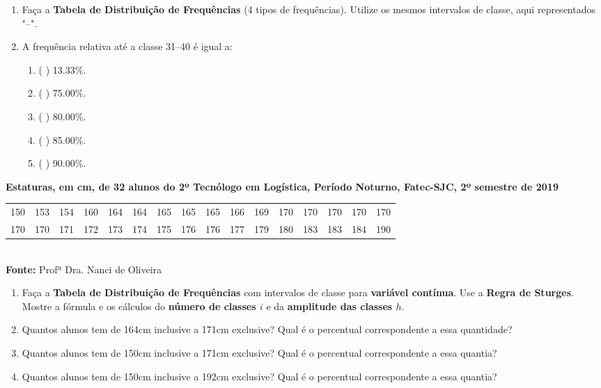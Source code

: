 \documentclass{jhwhw}
\begin{document}
\begin{enumerate}[label=\alph*)]
	\item Faça a \textbf{Tabela de Distribuição de Frequências} (4 tipos de frequências). Utilize os mesmos intervalos de classe, aqui representados "--".
	\item A frequência relativa até a classe 31--40 é igual a:
	      \begin{enumerate}[label=\textbf{\Alph*)}]
		      \item ( ) 13.33\%.
		      \item ( ) 75.00\%.
		      \item ( ) 80.00\%.
		      \item ( ) 85.00\%.
		      \item ( ) 90.00\%.
	      \end{enumerate}
\end{enumerate}

\begin{center}
	\textbf{Estaturas, em cm, de 32 alunos do 2º Tecnólogo em Logística, Período Noturno, Fatec-SJC, 2º semestre de 2019}\\
	\setlength{\tabcolsep}{4pt}
	\begin{tabular}{llllllllllllllll}
		\hline
		150 & 153 & 154 & 160 & 164 & 164 & 165 & 165 & 165 & 166 & 169 & 170 & 170 & 170 & 170 & 170 \\
		170 & 170 & 171 & 172 & 173 & 174 & 175 & 176 & 176 & 177 & 179 & 180 & 183 & 183 & 184 & 190 \\
		\hline
	\end{tabular}\\
	\textbf{Fonte:} Profª Dra. Nanci de Oliveira
\end{center}
\begin{enumerate}[label=\alph*)]
	\item Faça a \textbf{Tabela de Distribuição de Frequências} com intervalos de classe para \textbf{variável contínua}. Use a \textbf{Regra de Sturges}. Mostre a fórmula e os cálculos do \textbf{número de classes $i$} e da \textbf{amplitude das classes $h$}.
	\item Quantos alunos tem de 164cm inclusive a 171cm exclusive? Qual é o percentual correspondente a essa quantidade?
	\item Quantos alunos tem de 150cm inclusive a 171cm exclusive? Qual é o percentual correspondente a essa quantia?
	\item Quantos alunos tem de 150cm inclusive a 192cm exclusive? Qual é o percentual correspondente a essa quantia?
\end{enumerate}

\end{document}
